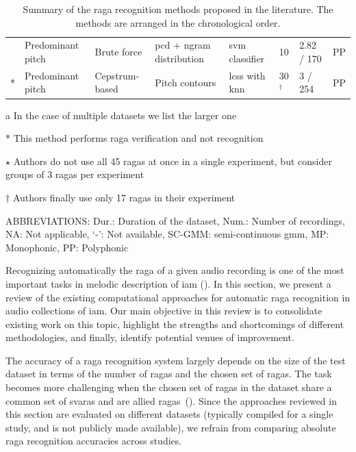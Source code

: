 \begin{table}
\begin{threeparttable}
\begin{centering}
\begin{tabular}{l P{4cm} P{2cm} P{2.5cm} P{2.5cm} L{1cm} P{1.5cm} P{.75cm}}
				\cite{kumar2014identifying} & Predominant pitch \citep{Salamon2012} & Brute force & \acrshort{pcd} + \acrshort{ngram} distribution & \acrshort{svm} classifier  & 10 & 2.82 / 170 & PP\tabularnewline
				\cite{shrey_ISMIR_2015}{*} & Predominant pitch\cite{Salamon2012} & Cepstrum-based & Pitch contours & \acrshort{lcss} with \acrshort{knn} & 30{$^\dagger$} & 3 / 254 & PP\tabularnewline
				\hline 
			\end{tabular}
			\par \end{centering}
		\begin{tablenotes}
			\item[a] In the case of multiple datasets we list the larger one
			\item[*] This method performs \gls{raga} verification and not recognition
			\item[$\star$] Authors do not use all 45 \glspl{raga} at once in a single experiment, but consider groups of 3 \glspl{raga} per experiment
			\item[$\dagger$] Authors finally use only 17 \glspl{raga} in their experiment
			\\
			\item [] ABBREVIATIONS: Dur.: Duration of the dataset, Num.: Number of recordings, NA: Not applicable, `-': Not available, SC-GMM: semi-continuous \acrshort{gmm}, MP: Monophonic, PP: Polyphonic
		\end{tablenotes}
		\caption[Summary of the existing \gls{raga} recognition methods]{Summary of the \Gls{raga} recognition methods proposed in the literature. The methods are arranged in the chronological order.}
		\label{tab:raga_recognition_methods_details}
	\end{threeparttable}
\end{table}

Recognizing automatically the \gls{raga} of a given audio recording is one of the most important tasks in melodic description of \gls{iam} (). In this section, we present a review of the existing computational approaches for automatic \gls{raga} recognition in audio collections of \gls{iam}. Our main objective in this review is to consolidate existing work on this topic, highlight the strengths and shortcomings of different methodologies, and finally, identify potential venues of improvement.

The accuracy of a \gls{raga} recognition system largely depends on the size of the test dataset in terms of the number of \glspl{raga} and the chosen set of \glspl{raga}. The task becomes more challenging when the chosen set of \glspl{raga} in the dataset share a common set of \glspl{svara} and are allied \glspl{raga}~(). Since the approaches reviewed in this section are evaluated on different datasets (typically compiled for a single study, and is not publicly made available), we refrain from comparing absolute \gls{raga} recognition accuracies across studies. 

